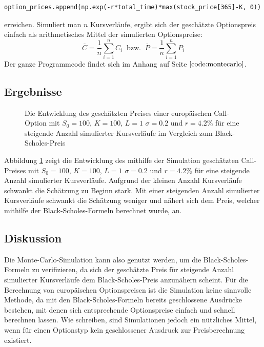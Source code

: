 \documentclass[11pt]{report} %
\begin{document}
\begin{lstlisting}
option_prices.append(np.exp(-r*total_time)*max(stock_price[365]-K, 0))
\end{lstlisting} erreichen.
Simuliert man $n$ Kursverläufe, ergibt sich der geschätzte Optionspreis einfach als arithmetisches Mittel der simulierten Optionspreise:
$$\overline{C}=\frac{1}{n}\sum_{i=1}^nC_i\ \text{ bzw. }\ \overline{P}=\frac{1}{n}\sum_{i=1}^nP_i$$
Der ganze Programmcode findet sich im Anhang auf Seite $\pageref{code:montecarlo}$.
\subsection{Ergebnisse}
\begin{figure}[H]
    \centering
    \caption{Die Entwicklung des geschätzten Preises einer europäischen Call-Option mit $S_0=100$, $K=100$, $L=1$ $\sigma=0.2$ und $r=4.2\%$ für eine steigende Anzahl simulierter Kursverläufe im Vergleich zum Black-Scholes-Preis}
    \label{fig:montecarlo-conv}
\end{figure}
Abbildung \ref{fig:montecarlo-conv} zeigt die Entwicklung des mithilfe der Simulation geschätzten Call-Preises mit $S_0=100$, $K=100$, $L=1$ $\sigma=0.2$ und $r=4.2\%$ für eine steigende Anzahl simulierter Kursverläufe. Aufgrund der kleinen Anzahl Kursverläufe schwankt die Schätzung zu Beginn stark. Mit einer steigenden Anzahl simulierter Kursverläufe schwankt die Schätzung weniger und nähert sich dem Preis, welcher mithilfe der Black-Scholes-Formeln berechnet wurde, an.
\subsection{Diskussion}
Die Monte-Carlo-Simulation kann also genutzt werden, um die Black-Scholes-Formeln zu verifizieren, da sich der geschätzte Preis für steigende Anzahl simulierter Kursverläufe dem Black-Scholes-Preis anzunähern scheint. Für die Berechnung von europäischen Optionspreisen ist die Simulation keine sinnvolle Methode, da mit den Black-Scholes-Formeln bereits geschlossene Ausdrücke bestehen, mit denen sich entsprechende Optionspreise einfach und schnell berechnen lassen. Wie \textcite{Broadie1996} schreiben, sind Simulationen jedoch ein nützliches Mittel, wenn für einen Optionstyp kein geschlossener Ausdruck zur Preisberechnung existiert.
\end{document}
